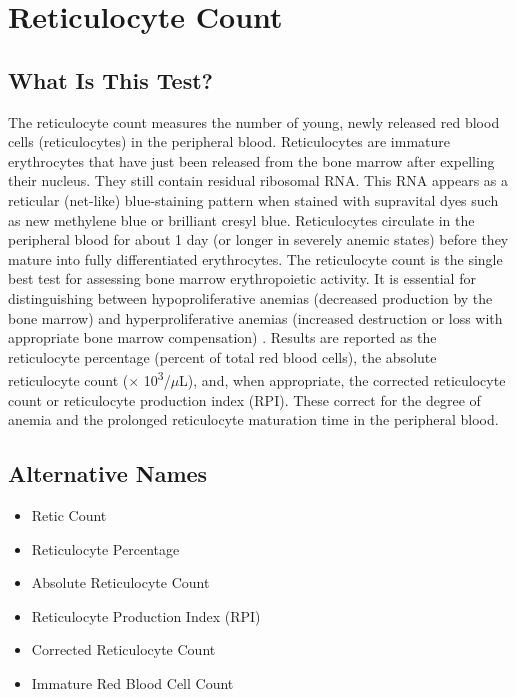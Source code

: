 \chapter{Reticulocyte Count}

\section*{What Is This Test?}
The reticulocyte count measures the number of young, newly released red blood cells (reticulocytes) in the peripheral blood. Reticulocytes are immature erythrocytes that have just been released from the bone marrow after expelling their nucleus. They still contain residual ribosomal RNA. This RNA appears as a reticular (net-like) blue-staining pattern when stained with supravital dyes such as new methylene blue or brilliant cresyl blue. Reticulocytes circulate in the peripheral blood for about 1 day (or longer in severely anemic states) before they mature into fully differentiated erythrocytes. The reticulocyte count is the single best test for assessing bone marrow erythropoietic activity. It is essential for distinguishing between hypoproliferative anemias (decreased production by the bone marrow) and hyperproliferative anemias (increased destruction or loss with appropriate bone marrow compensation) \cite{tierney2023current}. Results are reported as the reticulocyte percentage (percent of total red blood cells), the absolute reticulocyte count ($\times$ 10\textsuperscript{3}/$\mu$L), and, when appropriate, the corrected reticulocyte count or reticulocyte production index (RPI). These correct for the degree of anemia and the prolonged reticulocyte maturation time in the peripheral blood.

\section*{Alternative Names}
\begin{itemize}
  \item Retic Count
  \item Reticulocyte Percentage
  \item Absolute Reticulocyte Count
  \item Reticulocyte Production Index (RPI)
  \item Corrected Reticulocyte Count
  \item Immature Red Blood Cell Count
\end{itemize}
